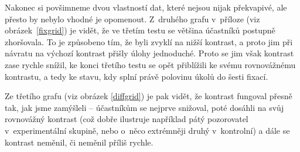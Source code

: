 Nakonec si povšimneme dvou vlastností dat, které nejsou nijak překvapivé, ale
přesto by nebylo vhodné je opomenout. Z~druhého grafu v~příloze (viz obrázek~\ref{fixgrid}) je vidět, že ve třetím testu se většina účastníků postupně
zhoršovala. To je způsobeno tím, že byli zvyklí na nižší kontrast, a proto jim
při návratu na výchozí kontrast přišly úlohy jednoduché. Proto se jim však
kontrast zase rychle snížil, ke konci třetího testu se opět přiblížili ke svému
rovnovážnému kontrastu, a tedy ke stavu, kdy splní právě polovinu úkolů do šesti
fixací.

Ze třetího grafu (viz obrázek \ref{diffgrid}) je pak vidět, že kontrast
fungoval přesně tak, jak jsme zamýšleli -- účastníkům se nejprve snižoval, poté
dosáhli na svůj rovnovážný kontrast (což dobře ilustruje například pátý
pozorovatel v~experimentální skupině, nebo o~něco extrémněji druhý v~kontrolní)
a dále se kontrast neměnil, či neměnil příliš rychle. 
